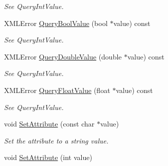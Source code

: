 \begin{DoxyCompactItemize}
\begin{DoxyCompactList}\small\item\em See Query\-Int\-Value. \end{DoxyCompactList}\item 
\hypertarget{classtinyxml2_1_1_x_m_l_attribute_a9e9b94369f182df72aaac9acd04afead}{X\-M\-L\-Error \hyperlink{classtinyxml2_1_1_x_m_l_attribute_a9e9b94369f182df72aaac9acd04afead}{Query\-Bool\-Value} (bool $\ast$value) const }\label{classtinyxml2_1_1_x_m_l_attribute_a9e9b94369f182df72aaac9acd04afead}

\begin{DoxyCompactList}\small\item\em See Query\-Int\-Value. \end{DoxyCompactList}\item 
\hypertarget{classtinyxml2_1_1_x_m_l_attribute_a0872c05edea2a7cde4bd96c1e9cb2fc4}{X\-M\-L\-Error \hyperlink{classtinyxml2_1_1_x_m_l_attribute_a0872c05edea2a7cde4bd96c1e9cb2fc4}{Query\-Double\-Value} (double $\ast$value) const }\label{classtinyxml2_1_1_x_m_l_attribute_a0872c05edea2a7cde4bd96c1e9cb2fc4}

\begin{DoxyCompactList}\small\item\em See Query\-Int\-Value. \end{DoxyCompactList}\item 
\hypertarget{classtinyxml2_1_1_x_m_l_attribute_afb254627c296d1d70b755397d32fece8}{X\-M\-L\-Error \hyperlink{classtinyxml2_1_1_x_m_l_attribute_afb254627c296d1d70b755397d32fece8}{Query\-Float\-Value} (float $\ast$value) const }\label{classtinyxml2_1_1_x_m_l_attribute_afb254627c296d1d70b755397d32fece8}

\begin{DoxyCompactList}\small\item\em See Query\-Int\-Value. \end{DoxyCompactList}\item 
\hypertarget{classtinyxml2_1_1_x_m_l_attribute_a406d2c4a13c7af99a65edb59dd9f7581}{void \hyperlink{classtinyxml2_1_1_x_m_l_attribute_a406d2c4a13c7af99a65edb59dd9f7581}{Set\-Attribute} (const char $\ast$value)}\label{classtinyxml2_1_1_x_m_l_attribute_a406d2c4a13c7af99a65edb59dd9f7581}

\begin{DoxyCompactList}\small\item\em Set the attribute to a string value. \end{DoxyCompactList}\item 
\hypertarget{classtinyxml2_1_1_x_m_l_attribute_ad86d7d7058d76761c3a80662566a57e5}{void \hyperlink{classtinyxml2_1_1_x_m_l_attribute_ad86d7d7058d76761c3a80662566a57e5}{Set\-Attribute} (int value)}\label{classtinyxml2_1_1_x_m_l_attribute_ad86d7d7058d76761c3a80662566a57e5}


\end{DoxyCompactItemize}
